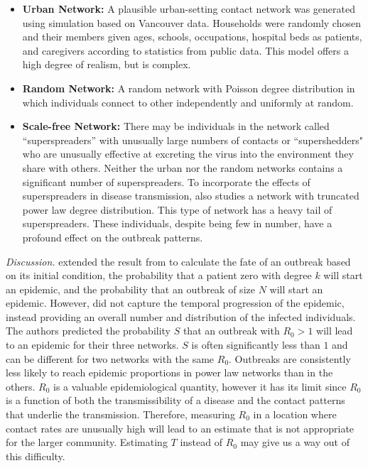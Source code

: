 \documentclass[10pt, journal,onecolumn]{IEEEtran}
\begin{document}
\begin{itemize}
\item \textbf{Urban Network:} A plausible urban-setting contact network was generated using
  simulation based on Vancouver data. Households were randomly chosen and
  their members given ages, schools, occupations, hospital beds as patients, and
  caregivers according to statistics from public data.
  This model offers a high degree of realism, but is complex.
\item \textbf{Random Network:} A random network with Poisson degree distribution in which
  individuals connect to other independently and uniformly at random.
\item \textbf{Scale-free Network:} There may be individuals in the network called ``superspreaders''
  with unusually large numbers of contacts or ``supershedders" who are unusually effective at
  excreting the virus into the environment they share with others. Neither the urban nor the random
  networks contains a significant number of superspreaders. To incorporate the effects of
  superspreaders in disease transmission, \citep{meyers2005network} also studies a network with
  truncated power law degree distribution. This type of network has a heavy tail of superspreaders.
  These individuals, despite being few in number, have a profound effect on the outbreak patterns.
\end{itemize}

\textit{Discussion.} \citep{meyers2005network} extended the result from \citep{newman2002spread} to calculate the fate
of an outbreak based on its initial condition, the probability that a patient zero with degree $k$ will
start an epidemic, and the probability that an outbreak of size $N$ will start an epidemic. However,
\citep{newman2002spread} did not capture the temporal progression of the epidemic, instead
providing an overall number and distribution of the infected individuals.
The authors predicted the probability $S$
that an outbreak with $R_0>1$ will lead to an epidemic for their three networks. $S$ is often
significantly less than $1$ and can be different for two networks with the same $R_0$. Outbreaks
are consistently less likely to reach epidemic proportions in power law networks than in
the others. $R_0$ is a valuable epidemiological quantity, however it has its limit since $R_0$ is
a function of both the transmissibility of a disease and the contact patterns that underlie the
transmission. Therefore, measuring $R_0$ in a location where contact rates are unusually high will
lead to an estimate that is not appropriate for the larger community. Estimating $T$ instead of
$R_0$ may give us a way out of this difficulty.
\end{document}
